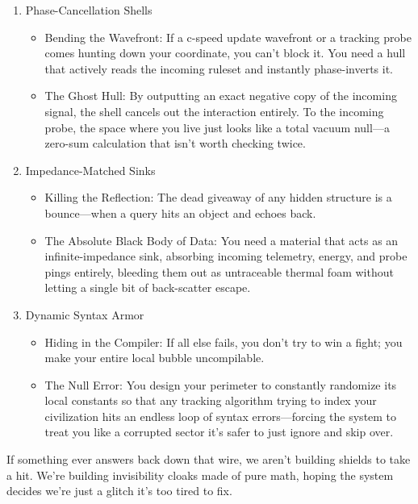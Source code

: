 \begin{enumerate}
\item Phase-Cancellation Shells

\begin{itemize}
\item Bending the Wavefront: If a c-speed update wavefront or a tracking probe comes hunting down your coordinate, you can't block it. You need a hull that actively reads the incoming ruleset and instantly phase-inverts it.
\item The Ghost Hull: By outputting an exact negative copy of the incoming signal, the shell cancels out the interaction entirely. To the incoming probe, the space where you live just looks like a total vacuum null—a zero-sum calculation that isn't worth checking twice.
\end{itemize}
\item Impedance-Matched Sinks

\begin{itemize}
\item Killing the Reflection: The dead giveaway of any hidden structure is a bounce—when a query hits an object and echoes back.
\item The Absolute Black Body of Data: You need a material that acts as an infinite-impedance sink, absorbing incoming telemetry, energy, and probe pings entirely, bleeding them out as untraceable thermal foam without letting a single bit of back-scatter escape.
\end{itemize}
\item Dynamic Syntax Armor

\begin{itemize}
\item Hiding in the Compiler: If all else fails, you don't try to win a fight; you make your entire local bubble uncompilable.
\item The Null Error: You design your perimeter to constantly randomize its local constants so that any tracking algorithm trying to index your civilization hits an endless loop of syntax errors—forcing the system to treat you like a corrupted sector it's safer to just ignore and skip over.
\end{itemize}
\end{enumerate}

If something ever answers back down that wire, we aren't building shields to take a hit. We're building invisibility cloaks made of pure math, hoping the system decides we're just a glitch it's too tired to fix.


